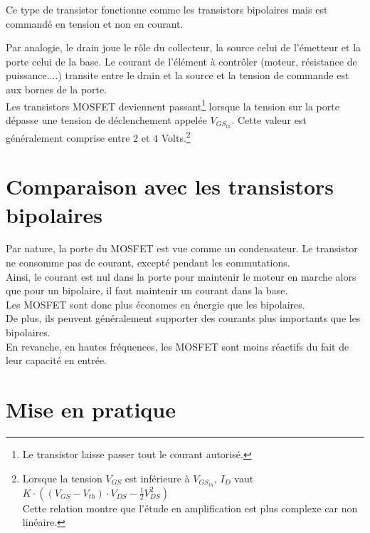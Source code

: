      Ce type de transistor fonctionne comme les transistors bipolaires mais est commandé en tension et non en courant.

     Par analogie, le drain joue le rôle du collecteur, la source celui de l'émetteur et la porte celui de la base.
     Le courant de l'élément à contrôler (moteur, résistance de puissance....) transite entre le drain et la source et la tension de commande est aux bornes de la porte.\\
     
     Les transistors MOSFET deviennent passant\footnote{Le transistor laisse passer tout le courant autorisé.} lorsque la tension sur la porte dépasse une tension de déclenchement appelée $V_{GS_{th}}$.
     Cette valeur est généralement comprise entre $2$ et $4$ Volts.\footnote{Lorsque la tension $V_{GS}$ est inférieure à $V_{GS_{th}}$, $I_D$ vaut $K \cdot ( (V_{GS}-V_{th})\cdot V_{DS}-\frac{1}{2}V_{DS}^2)$ \\Cette relation montre que l'étude en amplification est plus complexe car non linéaire.}\\


    \section{Comparaison avec les transistors bipolaires}

    Par nature, la porte du MOSFET est vue comme un condensateur. Le transistor ne consomme pas de courant, excepté pendant les commutations.\\
    Ainsi, le courant est nul dans la porte pour maintenir le moteur en marche alors que pour un bipolaire, il faut maintenir un courant dans la base.\\

    Les MOSFET sont donc plus économes en énergie que les bipolaires.\\
    De plus, ils peuvent généralement supporter des courants plus importants que les bipolaires.\\

    En revanche, en hautes fréquences, les MOSFET sont moins réactifs du fait de leur capacité en entrée.
     \section{Mise en pratique}

